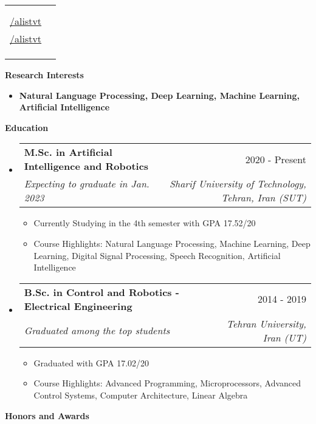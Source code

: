 \documentclass[letterpaper,12pt]{article}
\makeatletter
\def \fullname {Ali Satvaty}
\def \subtitle {Computer Engineer}
\def \emailicon {\faEnvelope}
\def \emaillink {mailto:alistvt@gmail.com}
\def \emailtext {alistvt@gmail.com}
\def \githubicon {\faGithub}
\def \githublink {https://github.com/alistvt}
\def \githubtext {/alistvt}
\def \linkedinicon {\faLinkedin}
\def \linkedinlink {https://www.linkedin.com/in/alistvt}
\def \linkedintext {/alistvt}
\def \headertype {\singlecol} %
\def \entryspacing {-0pt}
\def \linkedin {\linkedinicon \hspace{3pt}\href{\linkedinlink}{\linkedintext}}
\def \email {\emailicon \hspace{3pt}\href{\emaillink}{\emailtext}}
\def \github {\githubicon \hspace{3pt}\href{\githublink}{\githubtext}}
\renewcommand{\section}[2]{\vspace{5pt}
	\colorbox{secondary}{\color{white}\raggedbottom\normalsize\textbf{{#1}{\hspace{7pt}#2}}}
}
\newcommand{\resumeEntryStart}{\begin{itemize}[leftmargin=2.5mm]}
\newcommand{\resumeEntryEnd}{\end{itemize}\vspace{\entryspacing}}
\newcommand{\resumeItemListStart}{\begin{itemize}[leftmargin=4.5mm]}
\newcommand{\resumeItemListEnd}{\end{itemize}}
\newcommand{\resumeItem}[1]{
	\item\small{
		{#1 \vspace{-2pt}}
	}
}
\newcommand{\resumeEntryTSDL}[4]{
	\vspace{-1pt}\item[]
	\begin{tabularx}{0.97\textwidth}{X@{\hspace{60pt}}r}
		\textbf{\color{primary}#1} & {\firabook\color{accent}\small#2} \\
		\textit{\color{accent}\small#3} & \textit{\color{accent}\small#4} \\
	\end{tabularx}\vspace{-6pt}
}
\newcommand{\resumeEntryS}[2]{
	\item[]\small{
		\textbf{\color{primary}#1 }{ #2 \vspace{-6pt}}
	}
}
\newcommand{\doublecol}[6]{
	\begin{tabularx}{\textwidth}{Xr}
		{
			\begin{tabular}[c]{l}
				\fontsize{35}{45}\selectfont{\color{primary}{{\textbf{\fullname}}}} \\
			\end{tabular}
		} & {
			\begin{tabular}[c]{l@{\hspace{1.5em}}l}
				{\small#4} & {\small#1} \\
				{\small#5} & {\small#2} \\
				{\small#6} & {\small#3}
			\end{tabular}
		}
	\end{tabularx}
}
\newcommand{\singlecol}[6]{
	\begin{tabularx}{\textwidth}{Xr}
		{
			\begin{tabular}[b]{l}
				\fontsize{35}{45}\selectfont{\color{primary}{{\textbf{\fullname}}}} \\
			\end{tabular}
		} & {
			\begin{tabular}[c]{l}
				{\small#1} \\
				{\small#2} \\
				{\small#3} \\
				{\small#4} \\
				{\small#5} \\
				{\small#6}
			\end{tabular}
		}
	\end{tabularx}
}
\makeatother
\begin{document}
	
	
	\headertype{\email}{\linkedin}{\github}{}{}{} %
	\vspace{-10pt} %
	
	
	
	
	\section{\faQuestion}{Research Interests}
	\resumeEntryStart
	\resumeEntryS
	{Natural Language Processing, Deep Learning, Machine Learning, Artificial Intelligence}{}
	\resumeEntryEnd
	
	\section{\faGraduationCap}{Education}
	\resumeEntryStart
	\resumeEntryTSDL
	{M.Sc. in Artificial Intelligence and Robotics}{2020 - Present}{Expecting to graduate in Jan. 2023}
	{Sharif University of Technology, Tehran, Iran (SUT)}
	\resumeItemListStart
	\resumeItem {Currently Studying in the 4th semester with GPA 17.52/20}
	\resumeItem {Course Highlights: Natural Language Processing, Machine Learning, Deep Learning, Digital Signal Processing, Speech Recognition, Artificial Intelligence}
	\resumeItemListEnd
	\resumeEntryEnd
	
	\resumeEntryStart
	\resumeEntryTSDL
	{B.Sc. in Control and Robotics - Electrical Engineering}{2014 - 2019}
	{Graduated among the top students}{Tehran University, Iran (UT)}
	\resumeItemListStart
	\resumeItem {Graduated with GPA 17.02/20}
	\resumeItem {Course Highlights: Advanced Programming, Microprocessors, Advanced Control Systems, Computer Architecture, Linear Algebra}
	\resumeItemListEnd
	\resumeEntryEnd
	
	\section{\faTrophy}{Honors and Awards}
	
\end{document}
